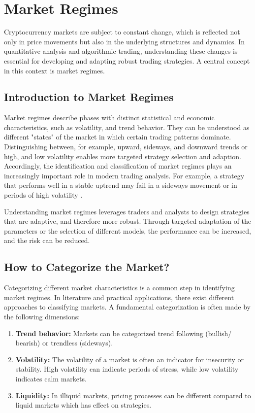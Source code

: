 \section{Market Regimes}

Cryptocurrency markets are subject to constant change, which is reflected not only in price movements but also in the underlying structures and dynamics.
In quantitative analysis and algorithmic trading, understanding these changes is essential for developing and adapting robust trading strategies.
A central concept in this context is market regimes.

\subsection{Introduction to Market Regimes}

Market regimes describe phases with distinct statistical and economic characteristics, such as volatility, and trend behavior.
They can be understood as different "states" of the market in which certain trading patterns dominate.
Distinguishing between, for example, upward, sideways, and downward trends or high, and low volatility enables more targeted strategy selection and adaption.
Accordingly, the identification and classification of market regimes plays an increasingly important role in modern trading analysis.
For example, a strategy that performs well in a stable uptrend may fail in a sideways movement or in periods of high volatility \cite{macrosynergy-market-regime-introduction}.

Understanding market regimes leverages traders and analysts to design strategies that are adaptive, and therefore more robust.
Through targeted adaptation of the parameters or the selection of different models, the performance can be increased, and the risk can be reduced.

\subsection{How to Categorize the Market?}
\label{chap:market-regime-categories}

Categorizing different market characteristics is a common step in identifying market regimes.
In literature and practical applications, there exist different approaches to classifying markets.
A fundamental categorization is often made by the following dimensions:

\begin{enumerate}
    \item \textbf{Trend behavior:} Markets can be categorized trend following (bullish/ bearish) or trendless (sideways).
    \item \textbf{Volatility:} The volatility of a market is often an indicator for insecurity or stability.
    High volatility can indicate periods of stress, while low volatility indicates calm markets.
    \item \textbf{Liquidity:} In illiquid markets, pricing processes can be different compared to liquid markets which has effect on strategies.
\end{enumerate}

